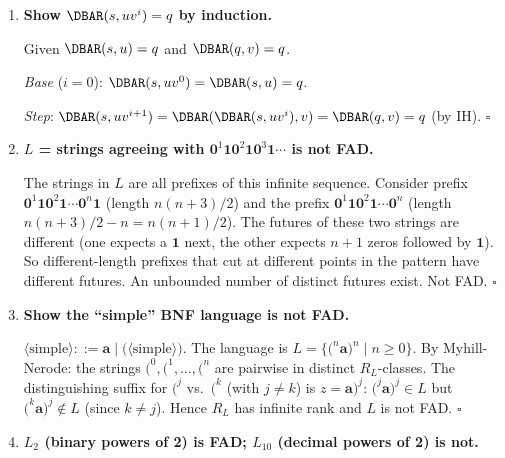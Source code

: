 \begin{enumerate}[{2.}1.]
Claim: $xRy\Leftrightarrow xuRyu$ (for all $u$).

The $\Rightarrow$ direction is given. For $\Leftarrow$: assume $xuRyu$ for all $u$; take $u=\lambda$: $x\lambda R y\lambda$, i.e., $xRy$ (since $x\lambda=x$ and $y\lambda=y$). $\square$

\item \textbf{Show $\DBAR(s,uv^i)=q$ by induction.}

Given $\DBAR(s,u)=q$ and $\DBAR(q,v)=q$.

\textit{Base} ($i=0$): $\DBAR(s,uv^0)=\DBAR(s,u)=q$. \checkmark

\textit{Step}: $\DBAR(s,uv^{i+1})=\DBAR(\DBAR(s,uv^i),v)=\DBAR(q,v)=q$ (by IH). $\square$

\item \textbf{$L$ = strings agreeing with $\mathbf{0}^1\mathbf{1}\mathbf{0}^2\mathbf{1}\mathbf{0}^3\mathbf{1}\cdots$ is not FAD.}

The strings in $L$ are all prefixes of this infinite sequence. Consider prefix $\mathbf{0}^1\mathbf{1}\mathbf{0}^2\mathbf{1}\cdots\mathbf{0}^n\mathbf{1}$ (length $n(n+3)/2$) and the prefix $\mathbf{0}^1\mathbf{1}\mathbf{0}^2\mathbf{1}\cdots\mathbf{0}^n$ (length $n(n+3)/2-n=n(n+1)/2$). The futures of these two strings are different (one expects a $\mathbf{1}$ next, the other expects $n+1$ zeros followed by $\mathbf{1}$). So different-length prefixes that cut at different points in the pattern have different futures. An unbounded number of distinct futures exist. Not FAD. $\square$

\item \textbf{Show the ``simple'' BNF language is not FAD.}

$\langle\text{simple}\rangle ::= \mathbf{a}\mid\mathbf{(}\langle\text{simple}\rangle\mathbf{)}$. The language is $L=\{\mathbf{(}^n\mathbf{a}\mathbf{)}^n\mid n\geq 0\}$. By Myhill-Nerode: the strings $\mathbf{(}^0,\mathbf{(}^1,\ldots,\mathbf{(}^n$ are pairwise in distinct $R_L$-classes. The distinguishing suffix for $\mathbf{(}^j$ vs.\ $\mathbf{(}^k$ (with $j\neq k$) is $z=\mathbf{a}\mathbf{)}^j$: $\mathbf{(}^j\mathbf{a}\mathbf{)}^j\in L$ but $\mathbf{(}^k\mathbf{a}\mathbf{)}^j\notin L$ (since $k\neq j$). Hence $R_L$ has infinite rank and $L$ is not FAD. $\square$

\item \textbf{$L_2$ (binary powers of 2) is FAD; $L_{10}$ (decimal powers of 2) is not.}


\end{enumerate}

